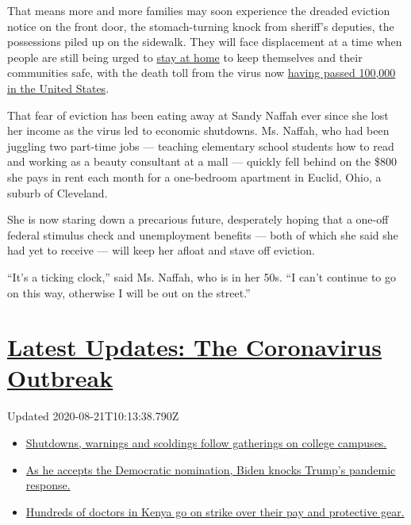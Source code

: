 That means more and more families may soon experience the dreaded
eviction notice on the front door, the stomach-turning knock from
sheriff's deputies, the possessions piled up on the sidewalk. They will
face displacement at a time when people are still being urged to
\href{https://www.nytimes3xbfgragh.onion/interactive/2020/us/states-reopen-map-coronavirus.html}{stay
at home} to keep themselves and their communities safe, with the death
toll from the virus now
\href{https://www.nytimes3xbfgragh.onion/2020/05/27/us/coronavirus-live-updates.html?}{having
passed 100,000 in the United States}.

That fear of eviction has been eating away at Sandy Naffah ever since
she lost her income as the virus led to economic shutdowns. Ms. Naffah,
who had been juggling two part-time jobs --- teaching elementary school
students how to read and working as a beauty consultant at a mall ---
quickly fell behind on the \$800 she pays in rent each month for a
one-bedroom apartment in Euclid, Ohio, a suburb of Cleveland.

She is now staring down a precarious future, desperately hoping that a
one-off federal stimulus check and unemployment benefits --- both of
which she said she had yet to receive --- will keep her afloat and stave
off eviction.

``It's a ticking clock,'' said Ms. Naffah, who is in her 50s. ``I can't
continue to go on this way, otherwise I will be out on the street.''

\hypertarget{latest-updates-the-coronavirus-outbreak}{%
\section{\texorpdfstring{\href{https://www.nytimes3xbfgragh.onion/2020/08/21/world/covid-19-coronavirus.html?action=click\&pgtype=Article\&state=default\&region=MAIN_CONTENT_1\&context=storylines_live_updates}{Latest
Updates: The Coronavirus
Outbreak}}{Latest Updates: The Coronavirus Outbreak}}\label{latest-updates-the-coronavirus-outbreak}}

Updated 2020-08-21T10:13:38.790Z

\begin{itemize}
\tightlist
\item
  \href{https://www.nytimes3xbfgragh.onion/2020/08/21/world/covid-19-coronavirus.html?action=click\&pgtype=Article\&state=default\&region=MAIN_CONTENT_1\&context=storylines_live_updates\#link-4690b6aa}{Shutdowns,
  warnings and scoldings follow gatherings on college campuses.}
\item
  \href{https://www.nytimes3xbfgragh.onion/2020/08/21/world/covid-19-coronavirus.html?action=click\&pgtype=Article\&state=default\&region=MAIN_CONTENT_1\&context=storylines_live_updates\#link-324af071}{As
  he accepts the Democratic nomination, Biden knocks Trump's pandemic
  response.}
\item
  \href{https://www.nytimes3xbfgragh.onion/2020/08/21/world/covid-19-coronavirus.html?action=click\&pgtype=Article\&state=default\&region=MAIN_CONTENT_1\&context=storylines_live_updates\#link-35890b73}{Hundreds
  of doctors in Kenya go on strike over their pay and protective gear.}
\end{itemize}

